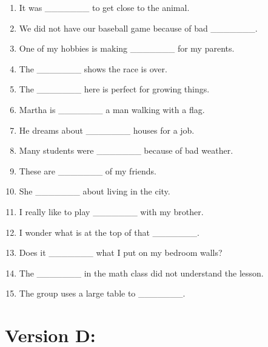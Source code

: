 \documentclass[a4paper,12pt]{article}
\begin{document}
\begin{enumerate}[label=\arabic*.]
    \item It was \_\_\_\_\_\_\_ to get close to the animal.
    \item We did not have our baseball game because of bad \_\_\_\_\_\_\_.
    \item One of my hobbies is making \_\_\_\_\_\_\_ for my parents.
    \item The \_\_\_\_\_\_\_ shows the race is over.
    \item The \_\_\_\_\_\_\_ here is perfect for growing things.
    \item Martha is \_\_\_\_\_\_\_ a man walking with a flag.
    \item He dreams about \_\_\_\_\_\_\_ houses for a job.
    \item Many students were \_\_\_\_\_\_\_ because of bad weather.
    \item These are \_\_\_\_\_\_\_ of my friends.
    \item She \_\_\_\_\_\_\_ about living in the city.
    \item I really like to play \_\_\_\_\_\_\_ with my brother.
    \item I wonder what is at the top of that \_\_\_\_\_\_\_.
    \item Does it \_\_\_\_\_\_\_ what I put on my bedroom walls?
    \item The \_\_\_\_\_\_\_ in the math class did not understand the lesson.
    \item The group uses a large table to \_\_\_\_\_\_\_.
\end{enumerate}

\newpage

\section*{Version D:}
\end{document}
